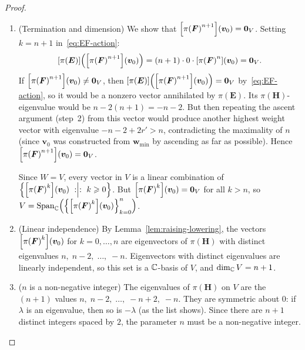 \documentclass[11pt,reqno]{amsart}
\begin{document}
\begin{proof}
\begin{enumerate}
\item (Termination and dimension)
We show that $\FUNC{\pi\Br{\bm F}^{n+1}}{\bm{v}_0}=\bm0_V$.
Setting $k=n+1$ in~\eqref{eq:EF-action}:
\[
\FUNC{\pi(\bm E)}{\FUNC{\pi\Br{\bm F}^{n+1}}{\bm{v}_0}}
=(n+1)\cdot 0\cdot\FUNC{\pi\Br{\bm F}^n}{\bm{v}_0}=\bm0_V.
\]
If $\FUNC{\pi\Br{\bm F}^{n+1}}{\bm{v}_0}\neq\bm0_V$, then
$\FUNC{\pi(\bm E)}{\FUNC{\pi\Br{\bm F}^{n+1}}{\bm{v}_0}}=\bm0_V$ by~\eqref{eq:EF-action},
so it would be a nonzero vector annihilated by $\pi(\bm E)$.
Its $\pi(\bm H)$-eigenvalue would be
$n-2(n+1)=-n-2$.  But then repeating the ascent argument (step~2)
from this vector would produce another highest weight vector with
eigenvalue $-n-2+2r'>n$, contradicting the maximality of $n$
(since $\bm{v}_0$ was constructed from $\bm{w}_{\min}$ by ascending as far as possible).
Hence $\FUNC{\pi\Br{\bm F}^{n+1}}{\bm{v}_0}=\bm0_V$.

Since $W=V$, every vector in $V$ is a linear combination of
$\set{\FUNC{\pi\Br{\bm F}^k}{\bm{v}_0}\st k\ge 0}$.
But $\FUNC{\pi\Br{\bm F}^k}{\bm{v}_0}=\bm0_V$ for all $k>n$, so
$V=\operatorname{Span}_\C\Br{\set{\FUNC{\pi\Br{\bm F}^k}{\bm{v}_0}}_{k=0}^n}$.

\item (Linear independence)
By Lemma~\ref{lem:raising-lowering}, the vectors
$\FUNC{\pi\Br{\bm F}^k}{\bm{v}_0}$ for $k=0,\dots,n$ are eigenvectors of
$\pi(\bm H)$ with distinct eigenvalues $n,\;n-2,\;\dots,\;-n$.
Eigenvectors with distinct eigenvalues are linearly independent,
so this set is a $\mathbb{C}$-basis of $V$, and $\dim_{\mathbb{C}} V=n+1$.

\item ($n$ is a non-negative integer)
The eigenvalues of $\pi(\bm H)$ on $V$ are the $(n+1)$ values
$n,\;n-2,\;\dots,\;-n+2,\;-n$.
They are symmetric about $0$: if $\lambda$ is an eigenvalue,
then so is $-\lambda$ (as the list shows).  Since there are
$n+1$ distinct integers spaced by $2$, the parameter $n$ must
be a non-negative integer.
\end{enumerate}
\end{proof}
\end{document}
